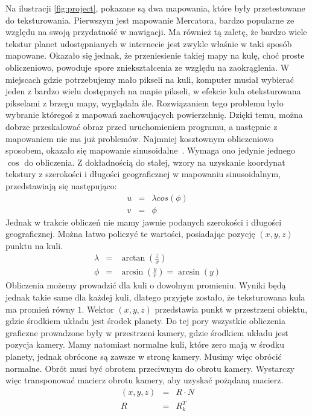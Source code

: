 Na ilustracji \hyperref[fig:project]{\ref{fig:project}}, pokazane są dwa mapowania, które były przetestowane do teksturowania. Pierwszym jest mapowanie Mercatora, bardzo popularne ze względu na swoją przydatność w nawigacji. Ma również tą zaletę, że bardzo wiele tekstur planet udostępnianych w internecie jest zwykle właśnie w taki sposób mapowane. Okazało się jednak, że przeniesienie takiej mapy na kulę, choć proste obliczeniowo, powoduje spore zniekształcenia ze względu na zaokrąglenia. W miejscach gdzie potrzebujemy mało pikseli na kuli, komputer musiał wybierać jeden z bardzo wielu dostępnych na mapie pikseli, w efekcie kula oteksturowana pikselami z brzegu mapy, wyglądała źle. Rozwiązaniem tego problemu było wybranie któregoś z mapowań zachowujących powierzchnię. Dzięki temu, można dobrze przeskalować obraz przed uruchomieniem programu, a następnie z mapowaniem nie ma już problemów. Najmniej kosztownym obliczeniowo sposobem, okazało się mapowanie sinusoidalne~\cite{wiki:sinus}. Wymaga ono jedynie jednego $\cos$ do obliczenia. Z dokładnością do stałej, wzory na uzyskanie koordynat tekstury z szerokości i długości geograficznej w mapowaniu sinusoidalnym, przedstawiają się następująco:
\begin{eqnarray}
	u &=& \lambda cos(\phi) \\ \nonumber
	v &=& \phi
\end{eqnarray}
Jednak w trakcie obliczeń nie mamy jawnie podanych szerokości i długości geograficznej. Można łatwo policzyć te wartości, posiadając pozycję $(x,y,z)$ punktu na kuli.
\begin{eqnarray}\label{eq:texobj}
	\lambda &=& \arctan(\frac{z}{x}) \\ \nonumber
	\phi &=& \arcsin(\frac{y}{r}) = \arcsin(y) 
\end{eqnarray}
Obliczenia możemy prowadzić dla kuli o dowolnym promieniu. Wyniki będą jednak takie same dla każdej kuli, dlatego przyjęte zostało, że teksturowana kula ma promień równy $1$. Wektor $(x,y,z)$ przedstawia punkt w przestrzeni obiektu, gdzie środkiem układu jest środek planety. Do tej pory wszystkie obliczenia graficzne prowadzone były w przestrzeni kamery, gdzie środkiem układu jest pozycja kamery. Mamy natomiast normalne kuli, które zero mają w środku planety, jednak obrócone są zawsze w stronę kamery. Musimy więc obrócić normalne. Obrót musi być obrotem przeciwnym do obrotu kamery. Wystarczy więc transponować macierz obrotu kamery, aby uzyskać pożądaną macierz.
\begin{eqnarray}
(x,y,z) &=& R \cdot N \\ \nonumber
R &=& R_k^T
\end{eqnarray}
